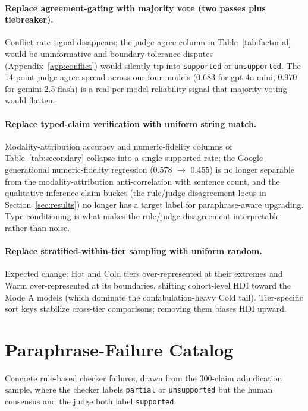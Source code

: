 \documentclass{article}
\theoremstyle{plain}
\begin{document}
\paragraph{Replace agreement-gating with majority vote (two passes plus tiebreaker).} Conflict-rate signal disappears; the judge-agree column in Table~\ref{tab:factorial} would be uninformative and boundary-tolerance disputes (Appendix~\ref{app:conflict}) would silently tip into \texttt{supported} or \texttt{unsupported}. The 14-point judge-agree spread across our four models (0.683 for gpt-4o-mini, 0.970 for gemini-2.5-flash) is a real per-model reliability signal that majority-voting would flatten.

\paragraph{Replace typed-claim verification with uniform string match.} Modality-attribution accuracy and numeric-fidelity columns of Table~\ref{tab:secondary} collapse into a single supported rate; the Google-generational numeric-fidelity regression (0.578 $\to$ 0.455) is no longer separable from the modality-attribution anti-correlation with sentence count, and the qualitative-inference claim bucket (the rule/judge disagreement locus in Section~\ref{sec:results}) no longer has a target label for paraphrase-aware upgrading. Type-conditioning is what makes the rule/judge disagreement interpretable rather than noise.

\paragraph{Replace stratified-within-tier sampling with uniform random.} Expected change: Hot and Cold tiers over-represented at their extremes and Warm over-represented at its boundaries, shifting cohort-level HDI toward the Mode A models (which dominate the confabulation-heavy Cold tail). Tier-specific sort keys stabilize cross-tier comparisons; removing them biases HDI upward.

\section{Paraphrase-Failure Catalog}
\label{app:paraphrases}

Concrete rule-based checker failures, drawn from the 300-claim adjudication sample, where the checker labels \texttt{partial} or \texttt{unsupported} but the human consensus and the judge both label \texttt{supported}:
\end{document}
